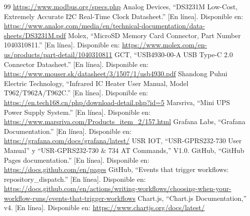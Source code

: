 \documentclass[11pt,a4paper]{article}
\begin{document}
\begin{thebibliography}{99}
    \url{https://www.modbus.org/specs.php}
 Analog Devices, ``DS3231M Low-Cost, Extremely Accurate I2C
    Real-Time Clock Datasheet.'' [En línea]. Disponible en:
    \url{https://www.analog.com/media/en/technical-documentation/data-sheets/DS3231M.pdf}
 Molex, ``MicroSD Memory Card Connector, Part Number
    1040310811.'' [En línea]. Disponible en:
    \url{https://www.molex.com/en-us/products/part-detail/1040310811}
 GCT, ``USB4930-00-A USB Type-C 2.0 Connector Datasheet.'' [En
    línea]. Disponible en: \url{https://www.mouser.sk/datasheet/3/1507/1/usb4930.pdf}
 Shandong Puhui Electric Technology, ``Infrared IC Heater User
    Manual, Model T962/T962A/T962C.'' [En línea]. Disponible en:
    \url{https://en.tech168.cn/php/download-detail.php?id=5}
 Marsriva, ``Mini UPS Power Supply System.'' [En línea].
    Disponible en: \url{https://www.marsriva.com/Products_item_2/157.html}
 Grafana Labs, ``Grafana Documentation.'' [En línea].
    Disponible en: \url{https://grafana.com/docs/grafana/latest/}
 USR IOT, ``USR-GPRS232-730 User Manual'' y ``USR-GPRS232-730
    \& 734 AT Commands,'' V1.0.
 GitHub, ``GitHub Pages documentation.'' [En línea].
    Disponible en: \url{https://docs.github.com/en/pages}
 GitHub, ``Events that trigger workflows:
    repository\_dispatch.'' [En línea]. Disponible en:
    \url{https://docs.github.com/en/actions/writing-workflows/choosing-when-your-workflow-runs/events-that-trigger-workflows}
 Chart.js, ``Chart.js Documentation,'' v4. [En línea].
    Disponible en: \url{https://www.chartjs.org/docs/latest/}
\end{thebibliography}
\end{document}
